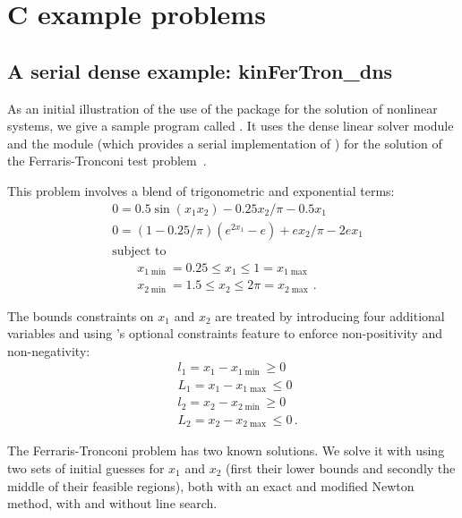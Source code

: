 \section{C example problems}\label{s:ex_c}

\subsection{A serial dense example: kinFerTron\_dns}\label{ss:kinFerTron_dns}

As an initial illustration of the use of the {\kinsol} package for the
solution of nonlinear systems, we give a sample program called .
It uses the {\kinsol} dense linear solver module {\kindense} 
and the {\nvecs} module (which provides a serial implementation of {\nvector})
for the solution of the Ferraris-Tronconi test problem~\cite{FlPa:99}.

This problem involves a blend of trigonometric and exponential terms:
\begin{equation}
\begin{split}
  & 0 = 0.5 \sin(x_1 x_2) - 0.25 x_2/\pi - 0.5 x_1 \\
  & 0 = (1-0.25/\pi) ( e^{2 x_1} - e ) + e x_2 / \pi - 2 e x_1 \\
  &\text{subject to } \\
  &\qquad x_{1\min} = 0.25 \le x_1 \le 1 = x_{1\max} \\
  &\qquad x_{2\min} = 1.5 \le x_2 \le 2\pi = x_{2\max} \, .
\end{split}
\end{equation}

The bounds constraints on $x_1$ and $x_2$ are treated by introducing
four additional variables and using {\kinsol}'s optional constraints
feature to enforce non-positivity and non-negativity:
\begin{equation*}
\begin{split}
  &l_1 = x_1 - x_{1\min} \ge 0\\
  &L_1 = x_1 - x_{1\max} \le 0\\
  &l_2 = x_2 - x_{2\min} \ge 0\\
  &L_2 = x_2 - x_{2\max} \le 0 \, .
\end{split}
\end{equation*}

The Ferraris-Tronconi problem has two known solutions. We solve it with
{\kinsol} using two sets of initial guesses for $x_1$ and $x_2$ (first their 
lower bounds and secondly the middle of their feasible regions), both with
an exact and modified Newton method, with and without line search.

